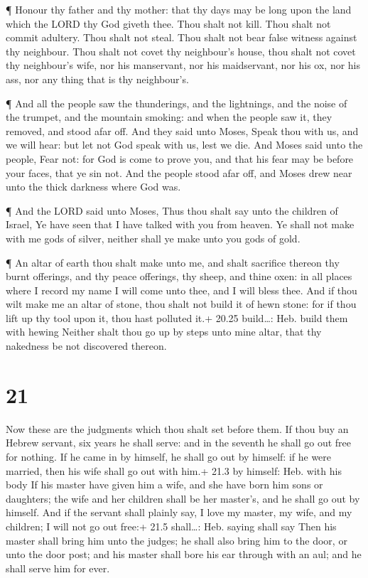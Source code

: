  ¶ Honour thy father and thy mother: that thy days may be
long upon the land which the LORD thy God giveth thee. 
Thou shalt not kill.  Thou shalt not commit adultery.
 Thou shalt not steal.  Thou shalt not bear
false witness against thy neighbour.  Thou shalt not covet
thy neighbour's house, thou shalt not covet thy neighbour's wife, nor
his manservant, nor his maidservant, nor his ox, nor his ass, nor any
thing that is thy neighbour's.

 ¶ And all the people saw the thunderings, and the
lightnings, and the noise of the trumpet, and the mountain smoking: and
when the people saw it, they removed, and stood afar off. 
And they said unto Moses, Speak thou with us, and we will hear: but let
not God speak with us, lest we die.  And Moses said unto
the people, Fear not: for God is come to prove you, and that his fear
may be before your faces, that ye sin not.  And the people
stood afar off, and Moses drew near unto the thick darkness where God
was.

 ¶ And the LORD said unto Moses, Thus thou shalt say unto
the children of Israel, Ye have seen that I have talked with you from
heaven.  Ye shall not make with me gods of silver, neither
shall ye make unto you gods of gold.

 ¶ An altar of earth thou shalt make unto me, and shalt
sacrifice thereon thy burnt offerings, and thy peace offerings, thy
sheep, and thine oxen: in all places where I record my name I will come
unto thee, and I will bless thee.  And if thou wilt make me
an altar of stone, thou shalt not build it of hewn stone: for if thou
lift up thy tool upon it, thou hast polluted it.+ 20.25 build\ldots:
Heb. build them with hewing  Neither shalt thou go up by
steps unto mine altar, that thy nakedness be not discovered thereon.

\hypertarget{section-20}{%
\section{21}\label{section-20}}

 Now these are the judgments which thou shalt set before
them.  If thou buy an Hebrew servant, six years he shall
serve: and in the seventh he shall go out free for nothing. 
If he came in by himself, he shall go out by himself: if he were
married, then his wife shall go out with him.+ 21.3 by himself: Heb.
with his body  If his master have given him a wife, and she
have born him sons or daughters; the wife and her children shall be her
master's, and he shall go out by himself.  And if the
servant shall plainly say, I love my master, my wife, and my children; I
will not go out free:+ 21.5 shall\ldots: Heb. saying shall say
 Then his master shall bring him unto the judges; he shall
also bring him to the door, or unto the door post; and his master shall
bore his ear through with an aul; and he shall serve him for ever.

